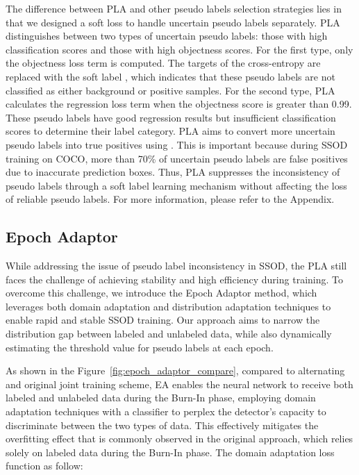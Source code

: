\documentclass[10pt,twocolumn,letterpaper]{article}
\begin{document}
The difference between PLA and other pseudo labels selection strategies\cite{liu2022unbiased, chen2022dense} lies in that we designed a soft loss to handle uncertain pseudo labels separately. PLA distinguishes between two types of uncertain pseudo labels: those with high classification scores and those with high objectness scores. For the first type, only the objectness loss term  is computed. The targets of the cross-entropy  are replaced with the soft label , which indicates that these pseudo labels are not classified as either background or positive samples. For the second type, PLA calculates the regression loss term  when the objectness score is greater than 0.99. These pseudo labels have good regression results but insufficient classification scores to determine their label category. PLA aims to convert more uncertain pseudo labels into true positives using . This is important because during SSOD training on COCO, more than 70\% of uncertain pseudo labels are false positives due to inaccurate prediction boxes. Thus, PLA suppresses the inconsistency of pseudo labels through a soft label learning mechanism without affecting the loss of reliable pseudo labels. For more information, please refer to the Appendix.








\subsection{Epoch Adaptor}
While addressing the issue of pseudo label inconsistency in SSOD, the PLA still faces the challenge of achieving stability and high efficiency during training. To overcome this challenge, we introduce the Epoch Adaptor method, which leverages both domain adaptation and distribution adaptation techniques to enable rapid and stable SSOD training. Our approach aims to narrow the distribution gap between labeled and unlabeled data, while also dynamically estimating the threshold value for pseudo labels at each epoch.

As shown in the Figure~\ref{fig:epoch_adaptor_compare}, compared to alternating and original joint training scheme, EA enables the neural network to receive both labeled and unlabeled data during the Burn-In phase, employing domain adaptation techniques with a classifier to perplex the detector's capacity to discriminate between the two types of data. This effectively mitigates the overfitting effect that is commonly observed in the original approach, which relies solely on labeled data during the Burn-In phase. The domain adaptation loss function as follow: 
\end{document}
